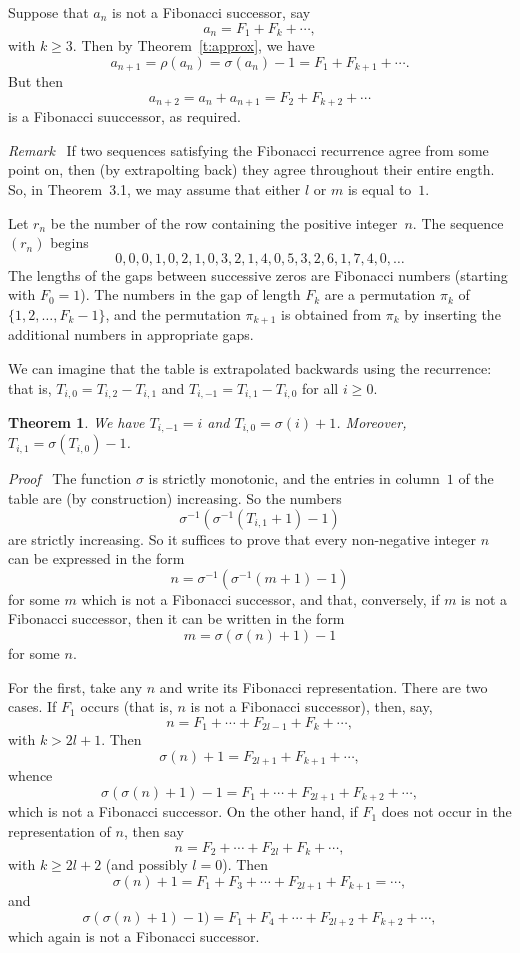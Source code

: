 \documentclass[12pt]{article}
\newtheorem{theorem}{Theorem}[section]
\newcommand{\head}[1]{\medbreak\noindent\textit{#1}\ }
\begin{document}
Suppose that $a_n$ is not a Fibonacci successor, say
\[a_n=F_1+F_k+\cdots,\]
with $k\ge3$. Then by Theorem~\ref{t:approx}, we have
\[a_{n+1}=\rho(a_n)=\sigma(a_n)-1=F_1+F_{k+1}+\cdots.\]
But then
\[a_{n+2}=a_n+a_{n+1}=F_2+F_{k+2}+\cdots\]
is a Fibonacci suuccessor, as required.

\head{Remark} If two sequences satisfying the Fibonacci recurrence
agree from some point on, then (by extrapolting back) they agree
throughout their entire ength. So, in Theorem~3.1, we may assume
that either $l$ or $m$ is equal to~$1$.

\medbreak

Let $r_n$ be the number of the row containing the positive integer~$n$.
The sequence $(r_n)$ begins
\[0,0,0,1,0,2,1,0,3,2,1,4,0,5,3,2,6,1,7,4,0,\ldots\]
The lengths of the gaps between successive zeros are Fibonacci numbers
(starting with $F_0=1$). The numbers in the gap of length $F_k$ are
a permutation $\pi_k$ of $\{1,2,\ldots, F_k-1\}$, and the permutation 
$\pi_{k+1}$ is obtained from $\pi_k$ by inserting the additional numbers
in appropriate gaps. 

\medbreak

We can imagine that the table is extrapolated backwards using
the recurrence: that is, $T_{i,0}=T_{i,2}-T_{i,1}$ and
$T_{i,-1}=T_{i,1}-T_{i,0}$ for all $i\ge0$.

\begin{theorem}
We have $T_{i,{-1}}=i$ and $T_{i,0}=\sigma(i)+1$. Moreover,
$T_{i,1}=\sigma(T_{i,0})-1$.
\end{theorem}

\head{Proof} The function $\sigma$ is strictly monotonic, and the
entries in column~$1$ of the table are (by construction) increasing.
So the numbers
\[\sigma^{-1}(\sigma^{-1}(T_{i,1}+1)-1)\]
are strictly increasing. So it suffices to prove that every
non-negative integer $n$ can be expressed in the form
\[n=\sigma^{-1}(\sigma^{-1}(m+1)-1)\]
for some $m$ which is not a Fibonacci successor, and that,
conversely, if $m$ is not a Fibonacci successor, then it can
be written in the form
\[m=\sigma(\sigma(n)+1)-1\]
for some $n$.

For the first, take any $n$ and write its Fibonacci representation.
There are two cases. If $F_1$ occurs (that is, $n$ is not a
Fibonacci successor), then, say,
\[n=F_1+\cdots+F_{2l-1}+F_k+\cdots,\]
with $k>2l+1$. Then
\[\sigma(n)+1=F_{2l+1}+F_{k+1}+\cdots,\]
whence
\[\sigma(\sigma(n)+1)-1=F_1+\cdots+F_{2l+1}+F_{k+2}+\cdots,\]
which is not a Fibonacci successor. On the other hand, if $F_1$
does not occur in the representation of $n$, then say
\[n=F_2+\cdots+F_{2l}+F_k+\cdots,\]
with $k\ge2l+2$ (and possibly $l=0$). Then
\[\sigma(n)+1=F_1+F_3+\cdots+F_{2l+1}+F_{k+1}=\cdots,\]
and
\[\sigma(\sigma(n)+1)-1)=F_1+F_4+\cdots+F_{2l+2}+F_{k+2}+\cdots,\]
which again is not a Fibonacci successor.
\end{document}
